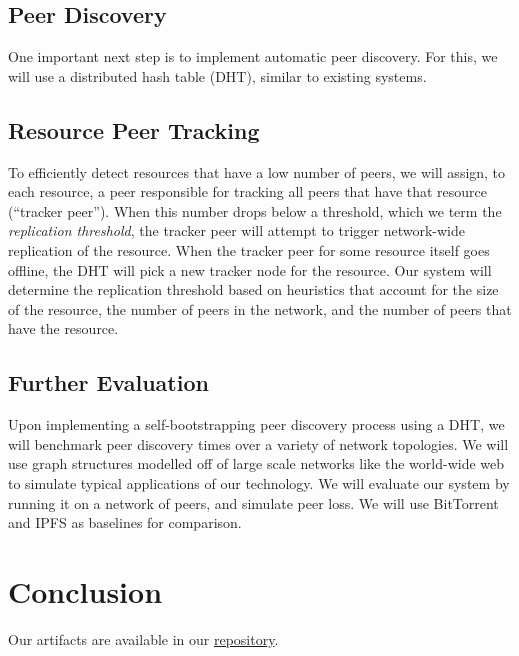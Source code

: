 \documentclass[twocolumn]{article}
\begin{document}
\subsection{Peer Discovery}

One important next step is to implement automatic peer discovery.
For this, we will use a distributed hash table (DHT), similar to existing systems.

\subsection{Resource Peer Tracking}

To efficiently detect resources that have a low number of peers, we will assign, to each resource, a peer responsible for tracking all peers that have that resource (``tracker peer'').
When this number drops below a threshold, which we term the \textit{replication threshold}, the tracker peer will attempt to trigger network-wide replication of the resource.
When the tracker peer for some resource itself goes offline, the DHT will pick a new tracker node for the resource.
Our system will determine the replication threshold based on heuristics that account for the size of the resource, the number of peers in the network, and the number of peers that have the resource.



\subsection{Further Evaluation}

Upon implementing a self-bootstrapping peer discovery process using a DHT, we will benchmark peer discovery times over a variety of network topologies.
We will use graph structures modelled off of large scale networks like the world-wide web to simulate typical applications of our technology.
We will evaluate our system by running it on a network of peers, and simulate peer loss.
We will use BitTorrent and IPFS as baselines for comparison.

\section{Conclusion}

Our artifacts are available in our \href{TODO}{repository}.
\end{document}
